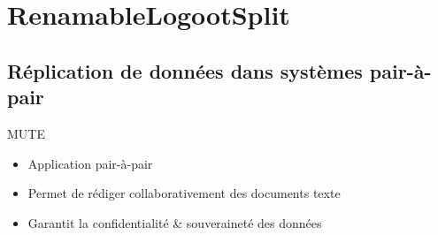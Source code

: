 \section{RenamableLogootSplit}

\subsection{Réplication de données dans systèmes pair-à-pair}

\begin{frame}{MUTE}
    \vspace{-0.5cm}
    \begin{figure}
    \end{figure}
    \vspace{-0.5cm}
    \begin{itemize}
        \item Application pair-à-pair
        \item Permet de rédiger collaborativement des documents texte
        \item Garantit la confidentialité \& souveraineté des données
    \end{itemize}
\end{frame}

